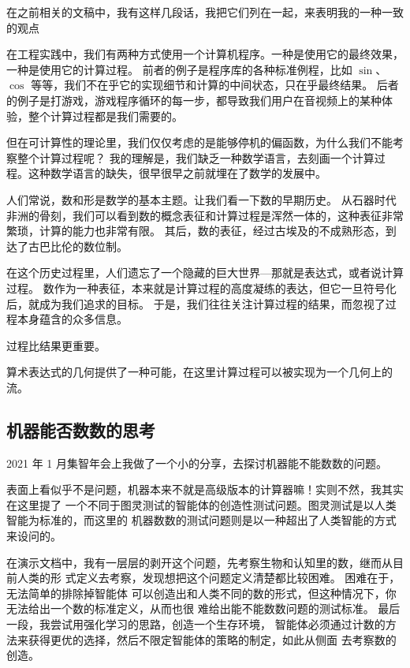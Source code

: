 \documentclass[a4paper,12pt]{article}
\numberwithin{problem}{section}
\numberwithin{definition}{section}
\numberwithin{lemma}{section}
\numberwithin{proposition}{section}
\numberwithin{theorem}{section}
\numberwithin{grammar}{section}
\numberwithin{program}{section}
\numberwithin{convention}{section}
\numberwithin{corollary}{section}
\begin{document}
在之前相关的文稿中，我有这样几段话，我把它们列在一起，来表明我的一种一致的观点

\begin{displayquote}
在工程实践中，我们有两种方式使用一个计算机程序。一种是使用它的最终效果，一种是使用它的计算过程。
前者的例子是程序库的各种标准例程，比如 $\sin$、$\cos$ 等等，我们不在乎它的实现细节和计算的中间状态，只在乎最终结果。
后者的例子是打游戏，游戏程序循环的每一步，都导致我们用户在音视频上的某种体验，整个计算过程都是我们需要的。
\end{displayquote}

但在可计算性的理论里，我们仅仅考虑的是能够停机的偏函数，为什么我们不能考察整个计算过程呢？
我的理解是，我们缺乏一种数学语言，去刻画一个计算过程。这种数学语言的缺失，很早很早之前就埋在了数学的发展中。

\begin{displayquote}
人们常说，数和形是数学的基本主题。让我们看一下数的早期历史。
从石器时代非洲的骨刻，我们可以看到数的概念表征和计算过程是浑然一体的，这种表征非常繁琐，计算的能力也非常有限。
其后，数的表征，经过古埃及的不成熟形态，到达了古巴比伦的数位制。

在这个历史过程里，人们遗忘了一个隐藏的巨大世界—那就是表达式，或者说计算过程。
数作为一种表征，本来就是计算过程的高度凝练的表达，但它一旦符号化后，就成为我们追求的目标。
于是，我们往往关注计算过程的结果，而忽视了过程本身蕴含的众多信息。

过程比结果更重要。
\end{displayquote}

算术表达式的几何提供了一种可能，在这里计算过程可以被实现为一个几何上的流。

\subsection{机器能否数数的思考}

2021 年 1 月集智年会上我做了一个小的分享，去探讨机器能不能数数的问题。

表面上看似乎不是问题，机器本来不就是高级版本的计算器嘛！实则不然，我其实在这里提了
一个不同于图灵测试的智能体的创造性测试问题。图灵测试是以人类智能为标准的，而这里的
机器数数的测试问题则是以一种超出了人类智能的方式来设问的。

在演示文档中，我有一层层的剥开这个问题，先考察生物和认知里的数，继而从目前人类的形
式定义去考察，发现想把这个问题定义清楚都比较困难。 困难在于，无法简单的排除掉智能体
可以创造出和人类不同的数的形式，但这种情况下，你无法给出一个数的标准定义，从而也很
难给出能不能数数问题的测试标准。 最后一段，我尝试用强化学习的思路，创造一个生存环境，
智能体必须通过计数的方法来获得更优的选择，然后不限定智能体的策略的制定，如此从侧面
去考察数的创造。
\end{document}
